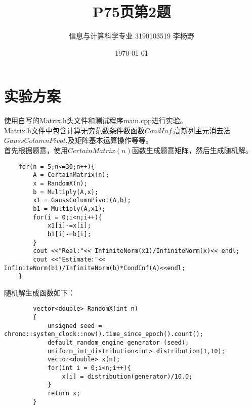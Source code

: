 \documentclass{article}
\title{P75页第2题}
\author{信息与计算科学专业 3190103519 李杨野}
\date{\today}
\begin{document}
    \maketitle
    \section{实验方案}
    使用自写的Matrix.h头文件和测试程序main.cpp进行实验。\\
    Matrix.h文件中包含计算无穷范数条件数函数$CondInf$,高斯列主元消去法$GaussColumnPivot$,及矩阵基本运算操作等等。\\
    首先根据题意，使用$CertainMatrix(n)$函数生成题意矩阵，然后生成随机解。
    \begin{lstlisting}
    for(n = 5;n<=30;n++){
        A = CertainMatrix(n);
        x = RandomX(n);
        b = Multiply(A,x);
        x1 = GaussColumnPivot(A,b);
        b1 = Multiply(A,x1);
        for(i = 0;i<n;i++){
            x1[i]-=x[i];
            b1[i]-=b[i];
        }
        cout <<"Real:"<< InfiniteNorm(x1)/InfiniteNorm(x)<< endl;
        cout <<"Estimate:"<< InfiniteNorm(b1)/InfiniteNorm(b)*CondInf(A)<<endl;
    }     
    \end{lstlisting}
    随机解生成函数如下：
    \begin{lstlisting}
        vector<double> RandomX(int n)
        {
            unsigned seed = chrono::system_clock::now().time_since_epoch().count();
            default_random_engine generator (seed);
            uniform_int_distribution<int> distribution(1,10);
            vector<double> x(n);
            for(int i = 0;i<n;i++){
                x[i] = distribution(generator)/10.0;
            }
            return x;
        }
    \end{lstlisting}
\end{document}
